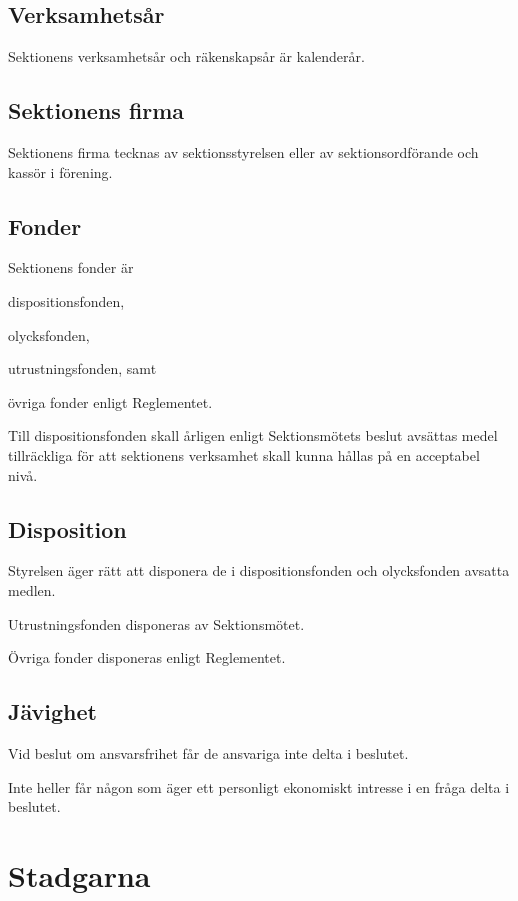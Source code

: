 \documentclass[10pt]{article}
\begin{document}
    \subsection{Verksamhetsår}
    Sektionens verksamhetsår och räkenskapsår är kalenderår.
    
    \subsection{Sektionens firma}
    Sektionens firma tecknas av sektionsstyrelsen eller av sektionsordförande och kassör i förening.
    
    \subsection{Fonder}
    Sektionens fonder är
    \begin{alphlist}
    \item dispositionsfonden,
    \item olycksfonden,
    \item utrustningsfonden, samt
    \item övriga fonder enligt Reglementet.
    \end{alphlist}
    
    Till dispositionsfonden skall årligen enligt Sektionsmötets beslut avsättas
    medel tillräckliga för att sektionens verksamhet skall kunna hållas på en
    acceptabel nivå.
    
    \subsection{Disposition}
    Styrelsen äger rätt att disponera de i dispositionsfonden och olycksfonden
    avsatta medlen.
    
    Utrustningsfonden disponeras av Sektionsmötet.
    
    Övriga fonder disponeras enligt Reglementet.
    
    \subsection{Jävighet}
    Vid beslut om ansvarsfrihet får de ansvariga inte delta i beslutet.
    
    Inte heller får någon som äger ett personligt ekonomiskt intresse i en
    fråga delta i beslutet.
    \newpage
    
    \section{Stadgarna}
\end{document}
